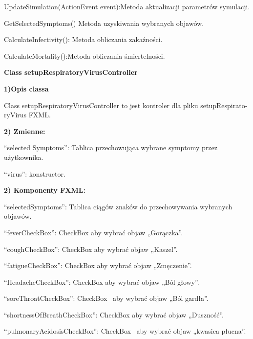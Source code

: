 \documentclass[a4paper]{article}
\begin{document}
\foreignlanguage{polish}{UpdateSimulation(ActionEvent event):Metoda aktualizacji parametrów symulacji.}

\foreignlanguage{polish}{GetSelectedSymptoms() Metoda uzyskiwania wybranych objawów.}

\foreignlanguage{polish}{CalculateInfectivity(): Metoda obliczania zakaźności.}

\foreignlanguage{polish}{CalculateMortality():Metoda obliczania śmiertelności.}


\bigskip


\bigskip

{\centering
\foreignlanguage{english}{\textbf{Class setupRespiratoryVirusController}}
\par}
\vspace{6pt}
\foreignlanguage{english}{\textbf{1)Opis classa}}

\foreignlanguage{english}{Class setupRespiratoryVirusController to jest kontroler dla pliku setupRespiratoryVirus FXML.}

\bigskip

\foreignlanguage{english}{\textbf{2) Zmienne:}}

\foreignlanguage{polish}{“selected Symptoms”: Tablica przechowująca wybrane symptomy przez użytkownika.}

\foreignlanguage{polish}{“virus”: konstructor. }

\bigskip

\foreignlanguage{polish}{\textbf{2) Komponenty FXML:}}

\foreignlanguage{polish}{“selectedSymptoms”: Tablica ciągów znaków do przechowywania wybranych objawów.}

\foreignlanguage{polish}{“feverCheckBox”: CheckBox aby wybrać objaw „Gorączka”.}

\foreignlanguage{polish}{“coughCheckBox”: CheckBox aby wybrać objaw „Kaszel”.}

\foreignlanguage{polish}{“fatigueCheckBox”: CheckBox aby wybrać objaw „Zmęczenie”.}

\foreignlanguage{polish}{“HeadacheCheckBox”: CheckBox aby wybrać objaw „Ból głowy”.}

\foreignlanguage{polish}{“soreThroatCheckBox”: CheckBox \ aby wybrać objaw „Ból gardła”.}

\foreignlanguage{polish}{“shortnessOfBreathCheckBox”: CheckBox aby wybrać objaw „Duszność”.}

\foreignlanguage{polish}{“pulmonaryAcidosisCheckBox”: CheckBox \ aby wybrać objaw „kwasica płucna”.}
\end{document}
